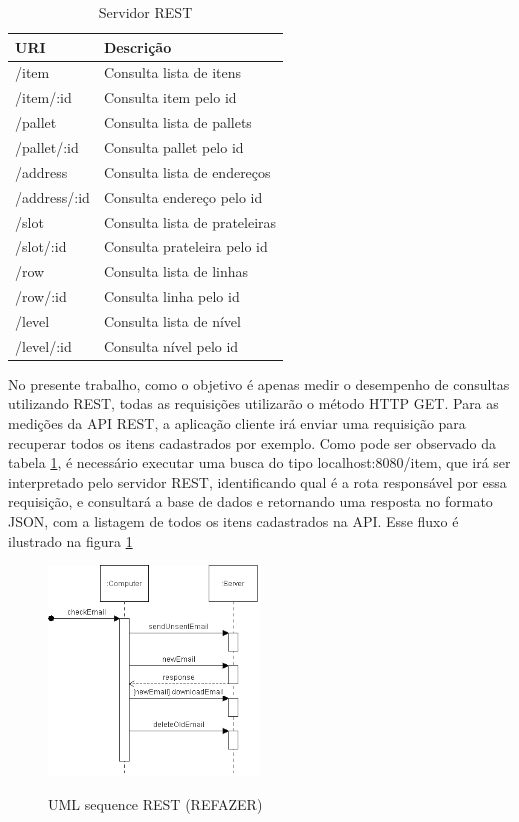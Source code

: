 \begin{table}
    \centering
    \begin{tabular}{| l | l |}
        \hline
        \textbf{URI} & \textbf{Descrição} \\ \hline
        /item & Consulta lista de itens \\ \hline
        /item/:id & Consulta item pelo id \\ \hline
        /pallet & Consulta lista de pallets  \\ \hline
        /pallet/:id & Consulta pallet pelo id  \\ \hline
        /address & Consulta lista de endereços \\ \hline
        /address/:id & Consulta endereço pelo id \\ \hline
        /slot & Consulta lista de prateleiras \\ \hline
        /slot/:id & Consulta prateleira pelo id \\ \hline
        /row & Consulta lista de linhas \\ \hline
        /row/:id & Consulta linha pelo id \\ \hline
        /level & Consulta lista de nível \\ \hline
        /level/:id & Consulta nível pelo id \\ \hline
    \end{tabular}
    \caption{Servidor REST} \label{tab:rest-url}
\end{table}


No presente trabalho, como o objetivo é apenas medir o desempenho de consultas utilizando REST, todas as requisições utilizarão o método HTTP GET. Para as medições da API REST, a aplicação cliente irá enviar uma requisição para recuperar todos os itens cadastrados por exemplo. Como pode ser observado da tabela \ref{tab:rest-url}, é necessário executar uma busca do tipo localhost:8080/item, que irá ser interpretado pelo servidor REST, identificando qual é a rota responsável por essa requisição, e consultará a base de dados e retornando uma resposta no formato JSON, com a listagem de todos os itens cadastrados na API. Esse fluxo é ilustrado na figura \ref{fig:rest-uml}

\begin{figure}[htbp]
\centering
\includegraphics[width=0.5\textwidth]{figuras/uml-sequence.png}
\label{fig:rest-uml}
\caption{UML sequence REST (REFAZER)}
\author{fonte: Autor}
\end{figure}
\pagebreak

